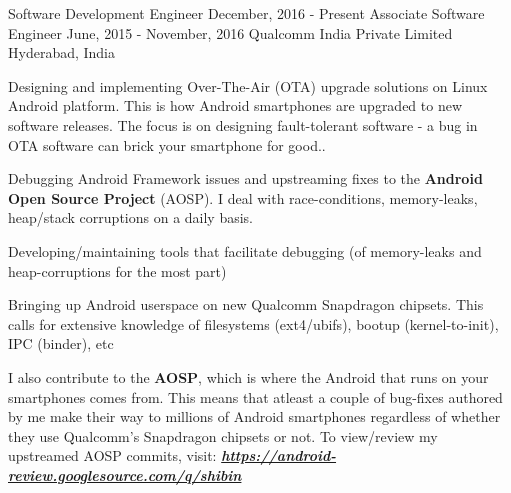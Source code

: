 

\begin{cvtwoposentries}

  \cvtwoposentry
    {Software Development Engineer} %
    {December, 2016 - Present} %
    {Associate Software Engineer}
    {June, 2015 - November, 2016}
    {Qualcomm India Private Limited} %
    {Hyderabad, India} %
    {
      \begin{cvitems} %
        \item {Designing and implementing Over-The-Air (OTA) upgrade solutions on Linux Android platform. This is how Android smartphones are upgraded to new software releases. \newline
        The focus is on designing fault-tolerant software - a bug in OTA software can brick your smartphone for good..}
        \item {Debugging Android Framework issues and upstreaming fixes to the \textbf{Android Open Source Project} (AOSP). I deal with race-conditions, memory-leaks, heap/stack corruptions on a daily basis.}
        \item {Developing/maintaining tools that facilitate debugging (of memory-leaks and heap-corruptions for the most part)}
        \item {Bringing up Android userspace on new Qualcomm Snapdragon chipsets. This calls for extensive knowledge of filesystems (ext4/ubifs), bootup (kernel-to-init), IPC (binder), etc}
        \item {I also contribute to the \textbf{AOSP}, which is where the Android that runs on your smartphones comes from. This means that atleast a couple of bug-fixes authored by me make their way to millions of Android smartphones regardless of whether they use Qualcomm's Snapdragon chipsets or not. \newline
        To view/review my upstreamed AOSP commits, visit: \textit{\textbf{\url{https://android-review.googlesource.com/q/shibin}}}}
      \end{cvitems}
    }

  
\end{cvtwoposentries}

